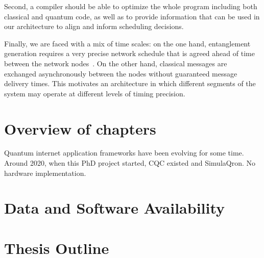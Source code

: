 Second, a compiler should be able to optimize the whole program including both classical and quantum code, as well as to provide information that can be used in our architecture to align and inform scheduling decisions. 

Finally, we are faced with a mix of time scales:
on the one hand, entanglement generation requires a very precise network schedule that is agreed ahead of time between the network nodes~\cite{dahlberg2019link}. On the other hand, classical messages are exchanged asynchronously between the nodes without guaranteed message delivery times. This motivates an architecture in which different segments of the system may operate at different levels of timing precision. 


\section{Overview of chapters}
Quantum internet application frameworks have been evolving for some time.
Around 2020, when this PhD project started, CQC existed and SimulaQron.
No hardware implementation.


\section{Data and Software Availability}
\lipsum[51]


\section{Thesis Outline}
\lipsum[52]


\begin{xstretch}
\printbibliography[heading=subbibintoc,title={References},notcategory=noprint]
\end{xstretch}
